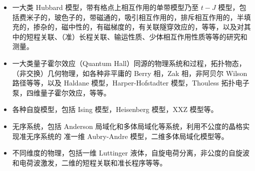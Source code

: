 \begin{itemize}

\item 一大类 Hubbard 模型\cite{hubbard-expan-2010,hubbard-expan-2012,microscope5,microscope6,af1,af2,af3,canted,incommensurate,af_long_range,pair_attractive,hidden_af_doped,charge-diffusion,spin-diffusion,floq-hubb-expr-2018,correlated-tunnel-expr-2018-shaking,correlated-tunnel-expr-2018-raman}，带有格点上相互作用的单带模型乃至 $t-J$ 模型\cite{olbook}，包括费米子的，玻色子的\cite{twobody-2017}，带磁通的\cite{twobody-2017}，吸引相互作用的\cite{pair_attractive}，排斥相互作用的，半填充的\cite{microscope5,microscope6}，掺杂的\cite{hidden_af_doped}，磁中性的，有磁梯度的\cite{twobody-2017}，有关联隧穿效应的\cite{floq-hubb-expr-2018,correlated-tunnel-expr-2018-shaking,correlated-tunnel-expr-2018-raman}，等等，以及对其中的短程关联\cite{af1,af2,af3}、（准）长程关联\cite{af_long_range,canted,pair_attractive,hidden_af_doped}、输运性质\cite{charge-diffusion,spin-diffusion}、少体相互作用性质\cite{twobody-2017}等等的研究和测量。

\item 一大类量子霍尔效应（Quantum Hall）同源的物理系统和过程\cite{topo2016zoller,harper1,harper2,zak-expr-2013,chern-expr-2015,ab-expr-2015,wilsonline-expr-2016,haldane-expr-2014,charge-pump-expr-2016-de,charge-pump-expr-2016-jp,4dqhall-expr-2018}，拓扑物态，（非交换）几何物理，如各种非平庸的 Berry 相\cite{ab-expr-2015}，Zak 相\cite{zak-expr-2013}，非阿贝尔 Wilson 路径\cite{wilsonline-expr-2016}等等，以及 Haldane 模型\cite{haldane-expr-2014}，Harper-Hofstadter 模型\cite{harper1,harper2}，Thouless 拓扑电子泵\cite{charge-pump-expr-2016-de,charge-pump-expr-2016-jp}，四维量子霍尔效应\cite{4dqhall-expr-2018}，等等。

\item 各种自旋模型\cite{spin-chain-expr-2011}，包括 Ising 模型，Heisenberg 模型，XXZ 模型等\cite{olbook}。

\item 无序系统\cite{mbl1d,mbl2d}，包括 Anderson 局域化和多体局域化等系统，利用不公度的晶格实现准无序系统的 准一维 Aubry-Andre 模型\cite{mbl1d}，二维多体局域化模型\cite{mbl2d}等。

\item 不同维度的物理，包括一维\cite{incommensurate,spin-chain-expr-2011,af2,hidden_af_doped} Luttinger 液体，自旋电荷分离，非公度的自旋波和电荷波激发\cite{incommensurate}，二维的短程关联和准长程序\cite{microscope5,microscope6,af1,af3,canted,af_long_range,pair_attractive,twobody-2017}等等。

\end{itemize}

